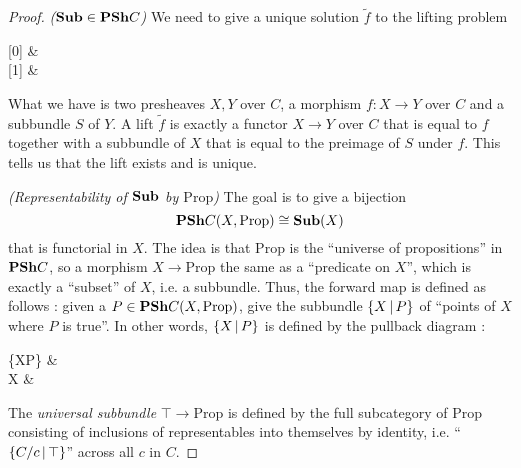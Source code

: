 \documentclass{article}
\begin{document}
\begin{proof}
  \textit{($\mathbf{Sub} \in \mathbf{PSh} C$)}
  We need to give a unique solution $\tilde{f}$ to
  the lifting problem 
  \begin{cd}
    {[0]} & {} \\
    {[1]} & {}
    \arrow["1"', from=1-1, to=2-1]
    \arrow["f"', from=2-1, to=2-2]
    \arrow["t", from=1-2, to=2-2]
    \arrow[from=1-1, to=1-2]
    \arrow["{\tilde{f}}"', dashed, from=2-1, to=1-2]
  \end{cd}
  What we have is two presheaves $X, Y$ over $ C$,
  a morphism $f : X \to Y$ over $ C$ and 
  a subbundle $S$ of $Y$.
  A lift $\tilde{f}$ is exactly a functor $X \to Y$ over $C$ 
  that is equal to $f$
  together with a subbundle of $X$ that is equal to 
  the preimage of $S$ under $f$.
  This tells us that the lift exists and is unique.

  \textit{(Representability of $\mathbf{Sub}$ by $\mathrm{Prop}$)}
  The goal is to give a bijection 
  \[
    \mathbf{PSh} C(X,\mathrm{Prop}) \cong \mathbf{Sub}(X)  
  \]
  that is functorial in $X$.
  The idea is that $\mathrm{Prop}$ is the ``universe of propositions''
  in $\mathbf{PSh} C$,
  so a morphism $X \to \mathrm{Prop}$ the same as a ``predicate on $X$'',
  which is exactly a ``subset'' of $X$, i.e. a subbundle.
  Thus, the forward map is defined as follows : 
  given a $P \in \mathbf{PSh} C(X,\mathrm{Prop})$,
  give the subbundle $\left\{X\,|\, P\right\}$ of 
  ``points of $X$ where $P$ is true''.
  In other words, $\left\{X\,|\, P\right\}$ is defined by the pullback diagram : 
  \begin{cd}
    {\{X\vert P\}} & \top \\
	  X & {}
	  \arrow["P"', from=2-1, to=2-2]
	  \arrow[from=1-1, to=2-1]
	  \arrow[from=1-2, to=2-2]
	  \arrow[from=1-1, to=1-2]
	  \arrow["\lrcorner"{anchor=center, pos=0.125}, draw=none, from=1-1, to=2-2]
  \end{cd}
  The \emph{universal subbundle} $\top \to \mathrm{Prop}$
  is defined by the full subcategory of $\mathrm{Prop}$
  consisting of inclusions of representables into themselves by identity,
  i.e. ``$\left\{C / c \,|\, \top\right\}$'' across all $c$ in $ C$.
  

\end{proof}
\end{document}
